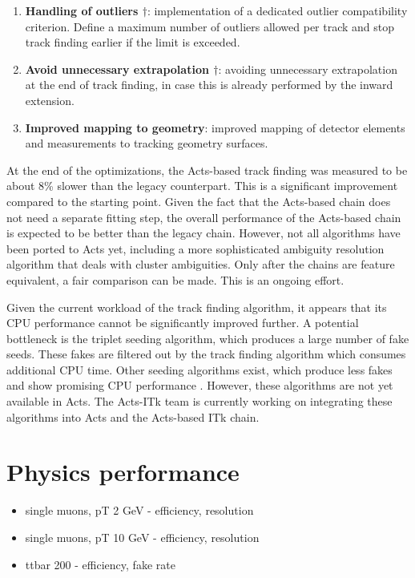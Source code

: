 \begin{enumerate}
    \item \textbf{Handling of outliers $\dagger$}: implementation of a dedicated outlier compatibility criterion. Define a maximum number of outliers allowed per track and stop track finding earlier if the limit is exceeded.
    \item \textbf{Avoid unnecessary extrapolation $\dagger$}: avoiding unnecessary extrapolation at the end of track finding, in case this is already performed by the inward extension.
    \item \textbf{Improved mapping to geometry}: improved mapping of detector elements and measurements to tracking geometry surfaces.
\end{enumerate}

At the end of the optimizations, the Acts-based track finding was measured to be about 8\% slower than the legacy counterpart. This is a significant improvement compared to the starting point. Given the fact that the Acts-based chain does not need a separate fitting step, the overall performance of the Acts-based chain is expected to be better than the legacy chain. However, not all algorithms have been ported to Acts yet, including a more sophisticated ambiguity resolution algorithm that deals with cluster ambiguities. Only after the chains are feature equivalent, a fair comparison can be made. This is an ongoing effort.

Given the current workload of the track finding algorithm, it appears that its CPU performance cannot be significantly improved further. A potential bottleneck is the triplet seeding algorithm, which produces a large number of fake seeds. These fakes are filtered out by the track finding algorithm which consumes additional CPU time. Other seeding algorithms exist, which produce less fakes and show promising CPU performance \cite{acts-gbts}. However, these algorithms are not yet available in Acts. The Acts-ITk team is currently working on integrating these algorithms into Acts and the Acts-based ITk chain.

\section{Physics performance}

\begin{itemize}
    \color{red}
    \item single muons, pT 2 GeV - efficiency, resolution
    \item single muons, pT 10 GeV - efficiency, resolution
    \item ttbar 200 - efficiency, fake rate
\end{itemize}

